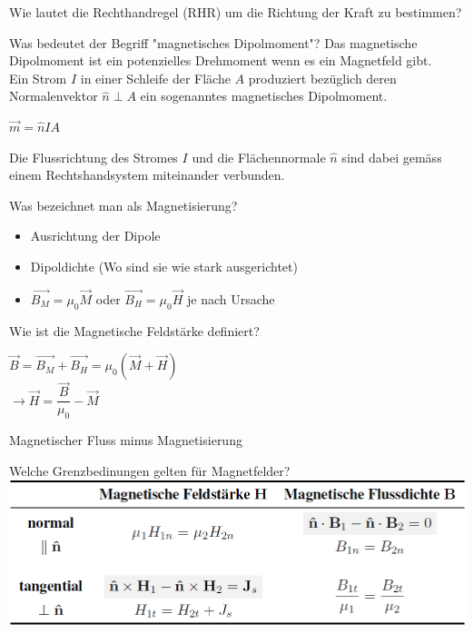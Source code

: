 \begin{karte}{Wie lautet die Rechthandregel (RHR) um die Richtung der Kraft zu bestimmen?}
\begin{karte}{Was bedeutet der Begriff "magnetisches Dipolmoment"?}
	Das magnetische Dipolmoment ist ein potenzielles Drehmoment wenn es ein Magnetfeld gibt.\\
	Ein Strom $I$ in einer Schleife der Fläche $A$ produziert bezüglich deren Normalenvektor $\hat{n} \perp A$ ein sogenanntes magnetisches Dipolmoment.\\
	\begin{center}
		\begin{huge}
			$\vec{m} = \hat{n} I A$
		\end{huge}
	\end{center}
	Die Flussrichtung des Stromes $I$ und die Flächennormale $\hat{n}$ sind dabei gemäss einem Rechtshandsystem miteinander verbunden.
\end{karte}

\begin{karte}{Was bezeichnet man als Magnetisierung?}
	\begin{itemize}
		\item Ausrichtung der Dipole
		\item Dipoldichte (Wo sind sie wie stark ausgerichtet)
		\item $\vec{B_M} = \mu_{0} \vec{M}$ oder $\vec{B_H} = \mu_{0} \vec{H}$ je nach Ursache
	\end{itemize}
\end{karte}

\begin{karte}{Wie ist die Magnetische Feldstärke definiert?}
	\begin{center}
		\begin{huge}
			$\vec{B} = \vec{B_M}+ \vec{B_H}= \mu_0 \left(\vec{M} + \vec{H}\right)$\\
			$\rightarrow \vec{H} = \dfrac{\vec{B}}{\mu_0} - \vec{M}$\\
		\end{huge}
	\end{center}
	Magnetischer Fluss minus Magnetisierung
\end{karte}

\begin{karte}{Welche Grenzbedinungen gelten für Magnetfelder?}
	\flushleft \includegraphics[width=\textwidth]{pics/MS_Grenzbedinung.png} %
\end{karte}


\end{karte}
